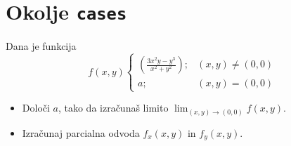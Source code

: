 \documentclass[a4paper,12pt]{article}
\begin{document}
   

\section*{Okolje \texttt{cases}}
Dana je funkcija
$$f(x,y)\begin{cases}
   (\frac{3x^2y-y^3}{x^2+y^2}); & (x,y)\neq(0,0)\\
   a; & (x,y)=(0,0)
\end{cases}$$

\begin{itemize}
\item Določi \(a\), tako da izračunaš limito \( \lim_{(x,y)\to(0,0)} f(x,y) \).
\item Izračunaj parcialna odvoda \(f_x(x,y)\) in \(f_y(x,y)\).
\end{itemize}
\end{document}
